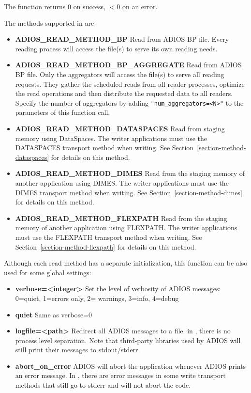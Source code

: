 \noindent The function returns 0 on success, $<0$ on an error.

The methods supported in \adiosversion are

\begin{itemize}
\item{\bf ADIOS\_READ\_METHOD\_BP}   Read from ADIOS BP file. 
Every reading process will access the file(s) to serve its own reading needs.

\item{\bf ADIOS\_READ\_METHOD\_BP\_AGGREGATE}   Read from ADIOS BP file. 
Only the aggregators will access the file(s) to serve all reading requests. They gather the scheduled reads from all reader processes, optimize the read operations and then distribute the requested data to all readers. Specify the number of aggregators by adding \verb+"num_aggregators=<N>"+ to the parameters of this function call.

\item{\bf ADIOS\_READ\_METHOD\_DATASPACES} Read from staging memory using DataSpaces. The writer applications must use the DATASPACES transport method when writing. See Section~\ref{section-method-dataspaces} for details on this method.

\item{\bf ADIOS\_READ\_METHOD\_DIMES} Read from the staging memory of another application using DIMES. The writer applications must use the DIMES transport method when writing. See Section~\ref{section-method-dimes} for details on this method.

\item{\bf ADIOS\_READ\_METHOD\_FLEXPATH} Read from the staging memory of another application using FLEXPATH. The writer applications must use the FLEXPATH transport method when writing. See Section~\ref{section-method-flexpath} for details on this method.

\end{itemize}

Although each read method has a separate initialization, this function can be also used for some global 
settings:

\begin{itemize}
\item{\bf verbose=<integer>} Set the level of verbosity of ADIOS messages: 0=quiet, 1=errors only, 2= warnings, 3=info, 4=debug
\item{\bf quiet} Same as verbose=0
\item{\bf logfile=<path>} Redirect all ADIOS messages to a file. in \adiosversion, there is no process level separation. Note that third-party libraries used by ADIOS will still print their messages to stdout/stderr.
\item{\bf abort\_on\_error} ADIOS will abort the application whenever ADIOS prints an error message. In \adiosversion, there are error messages in some write transport methods that still go to stderr and will not abort the code. 
\end{itemize}

